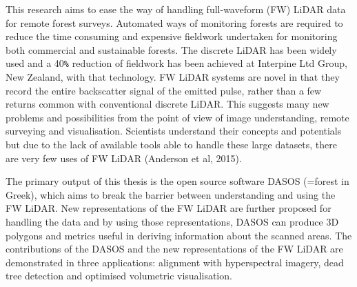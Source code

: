 \documentclass{subfiles}
\begin{document}
\par This research aims to ease the way of handling full-waveform (FW) LiDAR  data for remote forest surveys. Automated ways of monitoring forests are required to reduce the time consuming and expensive fieldwork undertaken for monitoring both commercial and sustainable forests. The discrete LiDAR has been widely used and a 40\verb|%| reduction of fieldwork has been achieved at Interpine Ltd Group, New Zealand, with that technology. FW LiDAR systems are novel in that they record the entire backscatter signal of the emitted pulse, rather than a few returns common with conventional discrete LiDAR. This suggests many new problems and possibilities from the point of view of image understanding, remote surveying and visualisation. Scientists understand their concepts and potentials but due to the lack of available tools able to handle these large datasets, there are very few uses of FW LiDAR (Anderson et al, 2015).

\par The primary output of this thesis is the open source software DASOS (=forest in Greek), which aims to break the barrier between understanding and using the FW LiDAR. New representations of the FW LiDAR are further proposed for handling the data and by using those representations, DASOS can produce 3D polygons and metrics useful in deriving information about the scanned areas. The contributions of the DASOS and the new representations of the FW LiDAR are demonstrated in three applications: alignment with hyperspectral imagery, dead tree detection and optimised volumetric visualisation.
\end{document}
